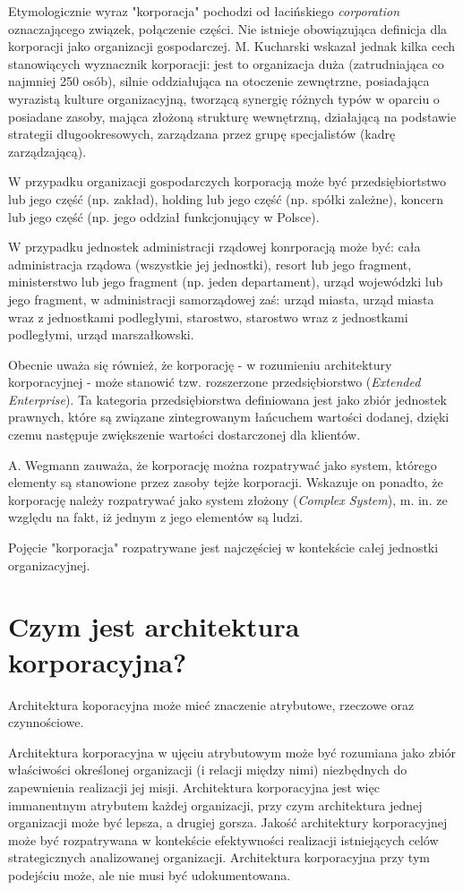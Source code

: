 Etymologicznie wyraz "korporacja" pochodzi od łacińskiego \textit{corporation} oznaczającego związek, połączenie części. Nie istnieje obowiązująca definicja dla korporacji jako organizacji gospodarczej. M. Kucharski wskazał jednak kilka cech stanowiących wyznacznik korporacji: jest to organizacja duża (zatrudniająca co najmniej 250 osób), silnie oddziałująca na otoczenie zewnętrzne, posiadająca wyrazistą kulture organizacyjną, tworzącą synergię różnych typów w oparciu o posiadane zasoby, mająca złożoną strukturę wewnętrzną, działającą na podstawie strategii długookresowych, zarządzana przez grupę specjalistów (kadrę zarządzającą). 

W przypadku organizacji gospodarczych korporacją może być przedsiębiortstwo lub jego część (np. zakład), holding lub jego część (np. spółki zależne), koncern lub jego część (np. jego oddział funkcjonujący w Polsce).

W przypadku jednostek administracji rządowej konrporacją może być: cała administracja rządowa (wszystkie jej jednostki), resort lub jego fragment, ministerstwo lub jego fragment (np. jeden departament), urząd wojewódzki lub jego fragment, w administracji samorządowej zaś: urząd miasta, urząd miasta wraz z jednostkami podległymi, starostwo, starostwo wraz z jednostkami podległymi, urząd marszałkowski.

Obecnie uważa się również, że korporację - w rozumieniu architektury korporacyjnej - może stanowić tzw. rozszerzone przedsiębiorstwo (\textit{Extended Enterprise}). Ta kategoria przedsiębiorstwa definiowana jest jako zbiór jednostek prawnych, które są związane zintegrowanym łańcuchem wartości dodanej, dzięki czemu następuje zwiększenie wartości dostarczonej dla klientów.

A. Wegmann zauważa, że korporację można rozpatrywać jako system, którego elementy są stanowione przez zasoby tejże korporacji. Wskazuje on ponadto, że korporację należy rozpatrywać jako system złożony (\textit{Complex System}), m. in. ze względu na fakt, iż jednym z jego elementów są ludzi. 

Pojęcie "korporacja" rozpatrywane jest najczęściej w kontekście całej jednostki organizacyjnej. 
\section{Czym jest architektura korporacyjna?}
Architektura koporacyjna może mieć znaczenie atrybutowe, rzeczowe oraz czynnościowe.

Architektura korporacyjna w ujęciu atrybutowym może być rozumiana jako zbiór właściwości określonej organizacji (i relacji między nimi) niezbędnych do zapewnienia realizacji jej misji. Architektura korporacyjna jest więc immanentnym atrybutem każdej organizacji, przy czym architektura jednej organizacji może być lepsza, a drugiej gorsza. Jakość architektury korporacyjnej może być rozpatrywana w kontekście efektywności realizacji istniejących celów strategicznych analizowanej organizacji. Architektura korporacyjna przy tym podejściu może, ale nie musi być udokumentowana.

